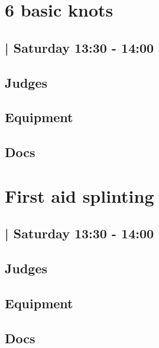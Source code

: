 \documentclass[10pt]{article}
\begin{document}
		\begin{minipage}{\linewidth}
		\setcounter{section}{32}
	\section{6 basic knots }
	\subsection*{ | Saturday 13:30 - 14:00}

	

	\begin{multicols}{2}
	\subsection*{\faUsers \: Judges}
	\begin{itemize}
		\end{itemize}
	\columnbreak
	\subsection*{\faWrench \: Equipment}
	        \vfill\null
        \subsection*{\faFile \: Docs}
     	\end{multicols}


	\vspace{1cm}
	\end{minipage}

		\begin{minipage}{\linewidth}
		\setcounter{section}{33}
	\section{First aid splinting }
	\subsection*{ | Saturday 13:30 - 14:00}

	

	\begin{multicols}{2}
	\subsection*{\faUsers \: Judges}
	\begin{itemize}
		\end{itemize}
	\columnbreak
	\subsection*{\faWrench \: Equipment}
	        \vfill\null
        \subsection*{\faFile \: Docs}
     	\end{multicols}


	\vspace{1cm}
	\end{minipage}
\end{document}

